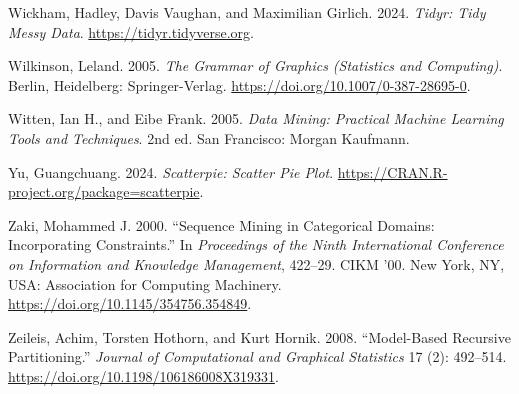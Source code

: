 \documentclass[
  notitlepage]{book}
\newlength{\cslhangindent}
\newenvironment{cslreferences}%
  {\setlength{\parindent}{0pt}%
  \everypar{\setlength{\hangindent}{\cslhangindent}}\ignorespaces}%
  {\par}
\begin{document}
\begin{cslreferences}
\leavevmode\hypertarget{ref-R-tidyr}{}%
Wickham, Hadley, Davis Vaughan, and Maximilian Girlich. 2024. \emph{Tidyr: Tidy Messy Data}. \url{https://tidyr.tidyverse.org}.

\leavevmode\hypertarget{ref-Wilkinson2005}{}%
Wilkinson, Leland. 2005. \emph{The Grammar of Graphics (Statistics and Computing)}. Berlin, Heidelberg: Springer-Verlag. \url{https://doi.org/10.1007/0-387-28695-0}.

\leavevmode\hypertarget{ref-RWeka2005}{}%
Witten, Ian H., and Eibe Frank. 2005. \emph{Data Mining: Practical Machine Learning Tools and Techniques}. 2nd ed. San Francisco: Morgan Kaufmann.

\leavevmode\hypertarget{ref-R-scatterpie}{}%
Yu, Guangchuang. 2024. \emph{Scatterpie: Scatter Pie Plot}. \url{https://CRAN.R-project.org/package=scatterpie}.

\leavevmode\hypertarget{ref-Zaki2000}{}%
Zaki, Mohammed J. 2000. ``Sequence Mining in Categorical Domains: Incorporating Constraints.'' In \emph{Proceedings of the Ninth International Conference on Information and Knowledge Management}, 422--29. CIKM '00. New York, NY, USA: Association for Computing Machinery. \url{https://doi.org/10.1145/354756.354849}.

\leavevmode\hypertarget{ref-party2008a}{}%
Zeileis, Achim, Torsten Hothorn, and Kurt Hornik. 2008. ``Model-Based Recursive Partitioning.'' \emph{Journal of Computational and Graphical Statistics} 17 (2): 492--514. \url{https://doi.org/10.1198/106186008X319331}.
\end{cslreferences}
\end{document}
